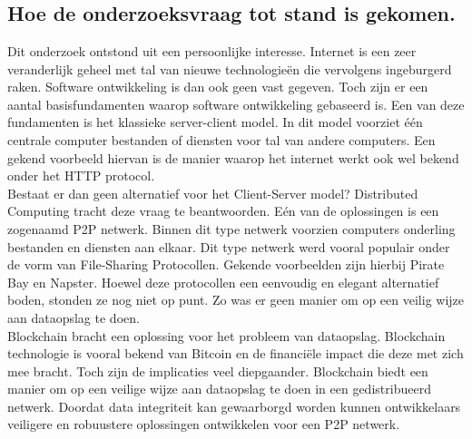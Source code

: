 
\chapter{}
\label{ch:methodologie}

\section{Hoe de onderzoeksvraag tot stand is gekomen.}
\label{POC_introduction}
Dit onderzoek ontstond uit een persoonlijke interesse. Internet is een zeer veranderlijk geheel met tal van nieuwe technologieën die vervolgens ingeburgerd raken. Software ontwikkeling is dan ook geen vast gegeven. Toch zijn er een aantal basisfundamenten waarop software ontwikkeling gebaseerd is. Een van deze fundamenten is het klassieke server-client model. In dit model voorziet één centrale computer bestanden of diensten voor tal van andere computers. Een gekend voorbeeld hiervan is de manier waarop het internet werkt ook wel bekend onder het HTTP protocol.\\

Bestaat er dan geen alternatief voor het Client-Server model? Distributed Computing tracht deze vraag te beantwoorden. Eén van de oplossingen is een zogenaamd P2P netwerk. Binnen dit type netwerk voorzien computers onderling bestanden en diensten aan elkaar. Dit type netwerk werd vooral populair onder de vorm van File-Sharing Protocollen. Gekende voorbeelden zijn hierbij Pirate Bay en Napster. Hoewel deze protocollen een eenvoudig en elegant alternatief boden, stonden ze nog niet op punt. Zo was er geen manier om op een veilig wijze aan dataopslag te doen.\\

Blockchain bracht een oplossing voor het probleem van dataopslag. Blockchain technologie is vooral bekend van Bitcoin en de financiële impact die deze met zich mee bracht. Toch zijn de implicaties veel diepgaander. Blockchain biedt een manier om op een veilige wijze aan dataopslag te doen in een gedistribueerd netwerk. Doordat data integriteit kan gewaarborgd worden kunnen ontwikkelaars veiligere en robuustere oplossingen ontwikkelen voor een P2P netwerk.\\

